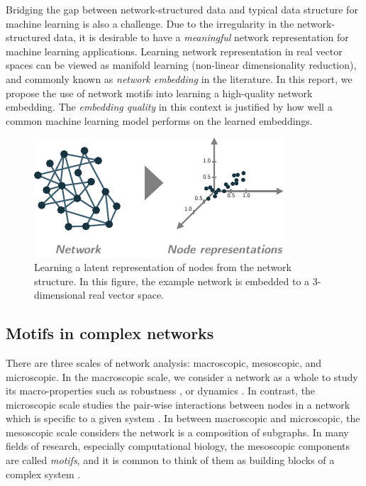\documentclass{article}
\theoremstyle{definition}
\begin{document}
Bridging the gap between network-structured data and typical
data structure for machine learning is also a challenge.
Due to the irregularity in the network-structured data,
it is desirable to have a \emph{meaningful}
network representation for machine learning applications.
Learning network representation in real vector spaces can be
viewed as manifold learning (non-linear dimensionality reduction),
and commonly known as \emph{network embedding} in the literature.
In this report, we propose the use of network motifs into learning
a high-quality network embedding. The \emph{embedding quality} in this
context is justified by how well a common machine learning model performs
on the learned embeddings.

\begin{figure} \label{fig:cartoon}
    \centering
    \includegraphics[width=0.7\linewidth]{cartoon_emb}
    \caption{Learning a latent representation of nodes from the network structure. In this figure, the example network is embedded to a 3-dimensional real vector space.}
\end{figure}

\subsection{Motifs in complex networks}

There are three scales of network analysis: macroscopic, mesoscopic,
and microscopic. In the macroscopic scale, we consider a network as a
whole to study its macro-properties such as robustness
\cite{callaway2000network}, or dynamics \cite{barabasi2014network}.
In contrast, the microscopic scale studies the pair-wise interactions
between nodes in a network which is specific to a given system
\cite{physicnet}. In between macroscopic and microscopic, the mesoscopic
scale considers the network is a composition of subgraphs.
In many fields of research, especially computational biology, the
mesoscopic components are called \emph{motifs}, and it is common
to think of them as building blocks of a complex system
\cite{motifblockmilo}.
\end{document}
